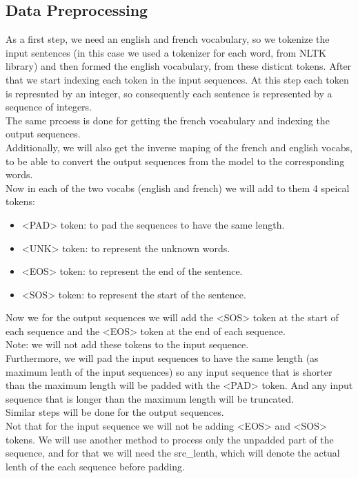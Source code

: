 \documentclass{article}
\begin{document}
\subsection{Data Preprocessing}
As a first step, we need an english and french vocabulary, so we tokenize the input sentences (in this case we used a tokenizer for each word, from NLTK library) and then formed the english vocabulary, from these disticnt tokens. After that we start indexing each token in the input sequences. At this step each token is represnted by an integer, so consequently each sentence is represented by a sequence of integers.\\
The same prcoess is done for getting the french vocabulary and indexing the output sequences.\\
Additionally, we will also get the inverse maping of the french and english vocabs, to be able to convert the output sequences from the model to the corresponding words.\\
Now in each of the two vocabs (english and french) we will add to them 4 speical tokens: 
\begin{itemize}
    \item <PAD> token: to pad the sequences to have the same length.
    \item <UNK> token: to represent the unknown words.
    \item <EOS> token: to represent the end of the sentence.
    \item <SOS> token: to represent the start of the sentence.
\end{itemize}
Now we for the output sequences we will add the <SOS> token at the start of each sequence and the <EOS> token at the end of each sequence.\\ Note: we will not add these tokens to the input sequence.\\
Furthermore, we will pad the input sequences to have the same length (as maximum lenth of the input sequences) so any input sequence that is shorter than the maximum length will be padded with the <PAD> token. And any input sequence that is longer than the maximum length will be truncated.\\ Similar steps will be done for the output sequences.\\ 
Not that for the input sequence we will not be adding <EOS> and <SOS> tokens. We will use another method to process only the unpadded part of the sequence, and for that we will need the src\_lenth, which will denote the actual lenth of the each sequence before padding.\\
\end{document}
